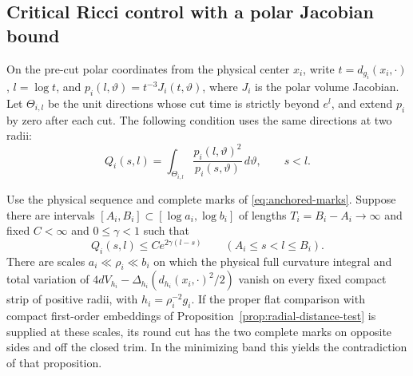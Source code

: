 \subsection{Critical Ricci control with a polar Jacobian bound}
\label{subsec:critical-radial-defect}

On the pre-cut polar coordinates from the physical center \(x_i\),
write \(t=d_{g_i}(x_i,\cdot)\), \(l=\log t\), and
\(p_i(l,\vartheta)=t^{-3}J_i(t,\vartheta)\), where \(J_i\) is
the polar volume Jacobian. Let \(\Theta_{i,l}\) be the unit
directions whose cut time is strictly beyond \(e^l\), and
extend \(p_i\) by zero after each cut. The following condition
uses the same directions at two radii:
\[
 Q_i(s,l)=\int_{\Theta_{i,l}}
         \frac{p_i(l,\vartheta)^2}{p_i(s,\vartheta)}
         \,d\vartheta,\qquad s<l .
\]

\begin{proposition}
\label{prop:critical-radial-defect}
Use the physical sequence and complete marks of
\eqref{eq:anchored-marks}. Suppose there are intervals
\([A_i,B_i]\subset[\log a_i,\log b_i]\) of lengths
\(T_i=B_i-A_i\to\infty\) and fixed \(C<\infty\) and
\(0\le\gamma<1\) such that
\begin{equation}\label{eq:critical-polar-jacobian}
 Q_i(s,l)\le C e^{2\gamma(l-s)}
 \qquad(A_i\le s<l\le B_i).
\end{equation}
There are scales \(a_i\ll\rho_i\ll b_i\) on which the
physical full curvature integral and total variation of
\(4dV_{h_i}-\Delta_{h_i}(d_{h_i}(x_i,\cdot)^2/2)\)
vanish on every fixed compact strip of positive radii,
with \(h_i=\rho_i^{-2}g_i\).
If the proper flat comparison with compact first-order
embeddings of Proposition~\ref{prop:radial-distance-test}
is supplied at these scales, its round cut has the two
complete marks on opposite sides and off the closed trim.
In the minimizing band this yields the contradiction of
that proposition.
\end{proposition}

